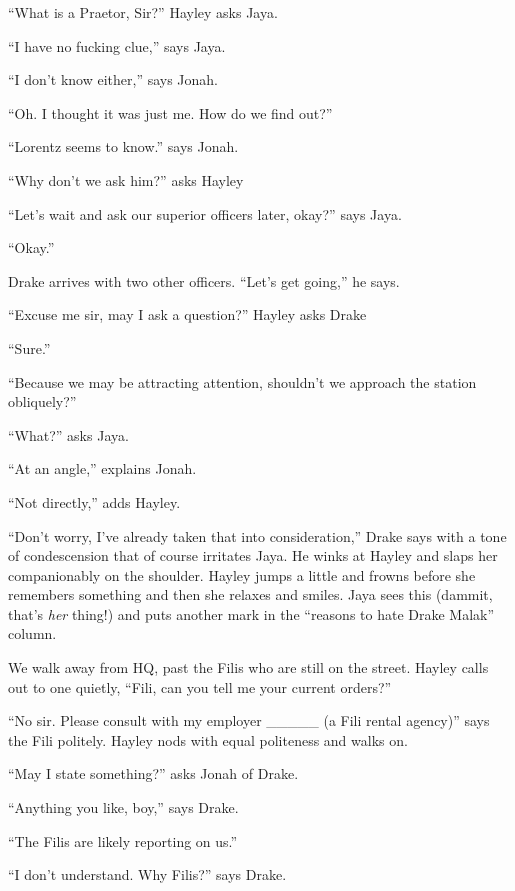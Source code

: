 ``What is a Praetor, Sir?'' Hayley asks Jaya.

``I have no fucking clue,'' says Jaya.

``I don't know either,'' says Jonah.

``Oh.  I thought it was just me.  How do we find out?''

``Lorentz seems to know.'' says Jonah.

``Why don't we ask him?'' asks Hayley

``Let's wait and ask our superior officers later, okay?'' says Jaya.

``Okay.''



Drake arrives with two other officers.  ``Let's get going,'' he says.

``Excuse me sir, may I ask a question?'' Hayley asks Drake

``Sure.''

``Because we may be attracting attention, shouldn't we approach the station obliquely?'' 

``What?'' asks Jaya.

``At an angle,'' explains Jonah.

``Not directly,'' adds Hayley.

``Don't worry, I've already taken that into consideration,'' Drake says with a tone of condescension that of course irritates Jaya.  He winks at Hayley and slaps her companionably on the shoulder.  Hayley jumps a little and frowns before she remembers something and then she relaxes and smiles.  Jaya sees this (dammit, that's \textit{her} thing!) and puts another mark in the ``reasons to hate Drake Malak'' column.  





We walk away from HQ, past the Filis who are still on the street.  Hayley calls out to one quietly, ``Fili, can you tell me your current orders?''

``No sir.  Please consult with my employer \_\_\_\_\_ (a Fili rental agency)'' says the Fili politely.  Hayley nods with equal politeness and walks on.

``May I state something?'' asks Jonah of Drake.

``Anything you like, boy,'' says Drake.

``The Filis are likely reporting on us.''

``I don't understand.  Why Filis?'' says Drake.

